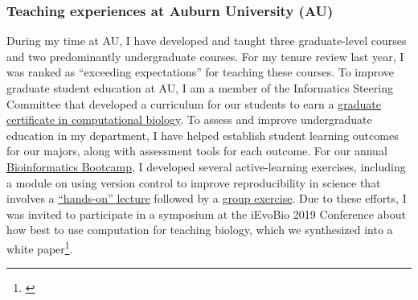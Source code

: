 \subsubsection*{Teaching experiences at Auburn University (AU)}
During my time at AU,
I have developed and taught three graduate-level courses
and two predominantly undergraduate courses.
For my tenure review last year, I was ranked as ``exceeding
expectations'' for teaching these courses.
To improve graduate student education at AU,
I am a member of the Informatics Steering Committee that developed a
curriculum for our students to earn a
\href{http://bulletin.auburn.edu/thegraduateschool/graduatedegreesoffered/biologicalsciencesmsphd_major/computationalbiology_gradcert/}{graduate certificate in computational biology}.
To assess and improve undergraduate education in my department, I have helped
establish student learning outcomes for our majors, along with assessment tools
for each outcome.
For our annual
\href{http://www.auburn.edu/cosam/bioinformatics/}{Bioinformatics Bootcamp},
I developed several active-learning exercises,
including a module on using version control to improve reproducibility in
science that involves a
\href{http://phyletica.org/slides/git-intro/}{``hands-on'' lecture}
followed by a
\href{https://github.com/joaks1/au-bootcamp-git-intro}{group exercise}.
Due to these efforts, I was invited to participate in a symposium at the
iEvoBio 2019 Conference about how best to use computation for teaching biology,
which we synthesized into a
white paper\footnote{\label{ievobiopaper}}.



